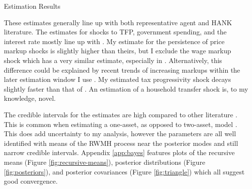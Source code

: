 \begin{table}[t]
    \centering
    \caption{Estimation Results}
    
    \label{tab:esti}
\end{table}

These estimates generally line up with both representative agent and HANK literature. The estimates for shocks to TFP, government spending, and the interest rate mostly line up with \textcites{smets2007shocks}{bayer2024shocks}. My estimate for the persistence of price markup shocks is slightly higher than theirs, but I exclude the wage markup shock which has a very similar estimate, especially in \textcite{smets2007shocks}. Alternatively, this difference could be explained by recent trends of increasing markups within the later estimation window I use \autocite{de2020rise}. My estimated tax progressivity shock decays slightly faster than that of \textcite{bayer2024shocks}. An estimation of a household transfer shock is, to my knowledge, novel.

The credible intervals for the estimates are high compared to other literature \autocites{smets2007shocks}{bayer2024shocks}. This is common when estimating a one-asset, as opposed to two-asset, model \autocite{auclert2021using}. This does add uncertainty to my analysis, however the parameters are all well identified with means of the RWMH process near the posterior modes and still narrow credible intervals. Appendix \ref{app:bayes} features plots of the recursive means (Figure \ref{fig:recursive-means}), posterior distributions (Figure \ref{fig:posteriors}), and posterior covariances (Figure \ref{fig:triangle}) which all suggest good convergence.
